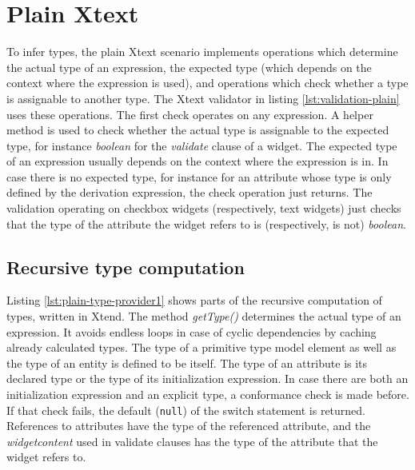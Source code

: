 \section{Plain Xtext}
\label{sec:plain-xtext}

To infer types, the plain Xtext scenario implements operations which determine
the actual type of an expression, the expected type (which depends on the
context where the expression is used), and operations which check whether a type
is assignable to another type. The Xtext validator in listing
\ref{lst:validation-plain} uses these operations. The first check operates on
any expression. A helper method is used to check whether the actual type is
assignable to the expected type, for instance \emph{boolean} for the
\emph{validate} clause of a widget. The expected type of an expression usually
depends on the context where the expression is in. In case there is no expected
type, for instance for an attribute whose type is only defined by the derivation
expression, the check operation just returns. The validation operating on
checkbox widgets (respectively, text widgets) just checks that the type of the
attribute the widget refers to is (respectively, is not) \emph{boolean}.




\subsection{Recursive type computation}
\label{sec:rectypecomputation}

Listing \ref{lst:plain-type-provider1} shows parts of the recursive computation
of types, written in Xtend. The method \emph{getType()} determines the actual
type of an expression. It avoids endless loops in case of cyclic dependencies by
caching already calculated types. The type of a primitive type model element as
well as the type of an entity is defined to be itself. The type of an attribute
is its declared type or the type of its initialization
expression.
In case there are both an initialization expression and an explicit type, a conformance
check is made before. If that check fails, the default (\verb|null|) of the
switch statement is returned. References to attributes have the type of the
referenced attribute, and the \emph{widgetcontent} used in validate clauses has
the type of the attribute that the widget refers to.

